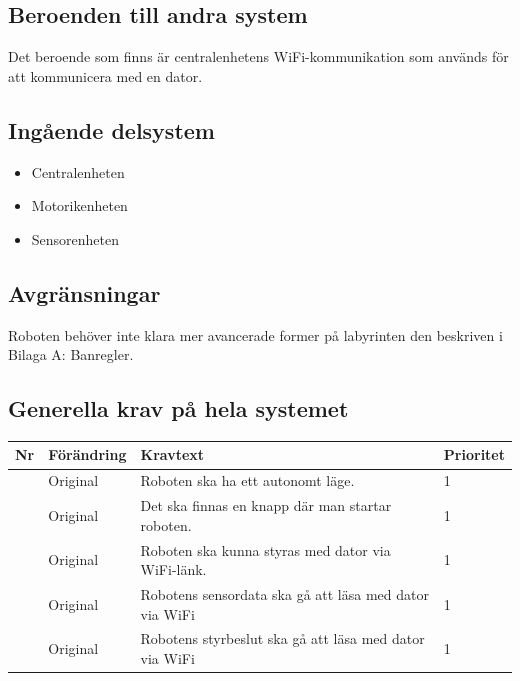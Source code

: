\documentclass[a4paper,titlepage,12pt]{article}
\newcounter{reqNr}
\newcommand{\nextReqNr}{\stepcounter{reqNr}\arabic{reqNr}}
\begin{document}
	\subsection{Beroenden  till andra system}
	Det beroende som finns är centralenhetens WiFi-kommunikation som används för 
	att kommunicera med en dator.
	\subsection{Ingående delsystem}
    \begin{itemize}
        \item Centralenheten
        \item Motorikenheten
        \item Sensorenheten
    \end{itemize}
	\subsection{Avgränsningar}
	Roboten behöver inte klara mer avancerade former på labyrinten den beskriven i Bilaga A: Banregler.
	\subsection{Generella krav på hela systemet}

	\begin{table}[h]
		\begin{tabularx}{\textwidth}{|c|l|X|l|}
		\hline
			\textbf{Nr} & \textbf{Förändring} & \textbf{Kravtext} & \textbf{Prioritet} 
				\\ \hline
	
			\nextReqNr & Original & Roboten ska ha ett autonomt läge. & 1
					\\ \hline

			\nextReqNr & Original & Det ska finnas en knapp där man startar 
				roboten. & 1
				\\ \hline

			\nextReqNr & Original & Roboten ska kunna styras med dator 
				via WiFi-länk. & 1
				\\ \hline
		
			\nextReqNr & Original & Robotens sensordata ska gå att läsa 
				med dator via WiFi & 1
				\\ \hline

			\nextReqNr & Original & Robotens styrbeslut ska gå att läsa 
				med dator via WiFi & 1
				\\ \hline
		\end{tabularx}
	\end{table}
\end{document}
